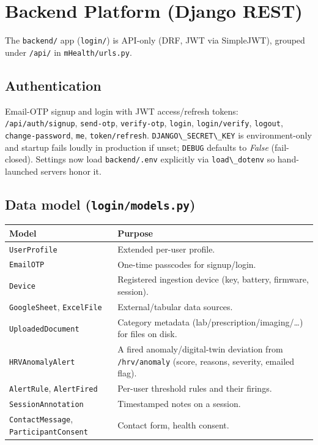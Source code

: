 \documentclass[11pt,a4paper]{article}
\newcommand{\code}[1]{\lstinline[basicstyle=\ttfamily\normalsize]!#1!}
\begin{document}
\section{Backend Platform (Django REST)}

The \code{backend/} app (\code{login/}) is API-only (DRF, JWT via SimpleJWT),
grouped under \code{/api/} in \code{mHealth/urls.py}.

\subsection{Authentication}
Email-OTP signup and login with JWT access/refresh tokens:
\code{/api/auth/signup}, \code{send-otp}, \code{verify-otp}, \code{login},
\code{login/verify}, \code{logout}, \code{change-password}, \code{me},
\code{token/refresh}. \code{DJANGO\_SECRET\_KEY} is environment-only and startup
fails loudly in production if unset; \code{DEBUG} defaults to \emph{False}
(fail-closed). Settings now load \code{backend/.env} explicitly via
\code{load\_dotenv} so hand-launched servers honor it.

\subsection{Data model (\texttt{login/models.py})}
\begin{longtable}{@{}p{}p{}@{}}
\toprule
\textbf{Model} & \textbf{Purpose} \\
\midrule
\endhead
\code{UserProfile} & Extended per-user profile. \\
\code{EmailOTP} & One-time passcodes for signup/login. \\
\code{Device} & Registered ingestion device (key, battery, firmware, session). \\
\code{GoogleSheet}, \code{ExcelFile} & External/tabular data sources. \\
\code{UploadedDocument} & Category metadata (lab/prescription/imaging/\ldots) for
files on disk. \\
\code{HRVAnomalyAlert} & A fired anomaly/digital-twin deviation from
\code{/hrv/anomaly} (score, reasons, severity, emailed flag). \\
\code{AlertRule}, \code{AlertFired} & Per-user threshold rules and their firings. \\
\code{SessionAnnotation} & Timestamped notes on a session. \\
\code{ContactMessage}, \code{ParticipantConsent} & Contact form, health consent. \\
\bottomrule
\end{longtable}
\end{document}
